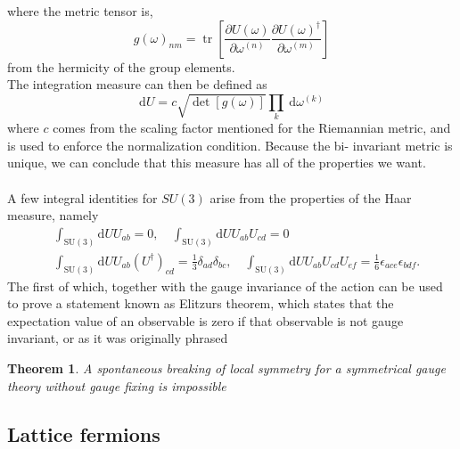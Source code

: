 \documentclass[a4paper,10pt]{article}
\newtheorem{theorem}{Theorem}
\begin{document}
where the metric tensor is,
$$
g(\omega)_{n m}=\operatorname{tr}\left[\frac{\partial U(\omega)}{\partial \omega^{(n)}} \frac{\partial U(\omega)^{\dagger}}{\partial \omega^{(m)}}\right]
$$
from the hermicity of the group elements.\\
The integration measure can then be defined as
\begin{equation}
\mathrm{d} U=c \sqrt{\operatorname{det}[g(\omega)]} \prod_{k} \mathrm{~d} \omega^{(k)}
\end{equation}
where $c$ comes from the scaling factor mentioned for the Riemannian metric, and is used to enforce the normalization condition.
Because the bi- invariant metric is unique, we can conclude that this measure has all of the properties we want.\\\\A few integral identities for $SU(3)$ arise from the properties of the Haar measure, namely
\begin{equation}
\begin{aligned}
&\int_{\mathrm{SU}(3)} \mathrm{d} U U_{a b}=0, \quad
\int_{\mathrm{SU}(3)} \mathrm{d} U U_{a b} U_{c d}=0 \\
&\int_{\mathrm{SU}(3)} \mathrm{d} U U_{a b}\left(U^{\dagger}\right)_{c d}=\frac{1}{3} \delta_{a d} \delta_{b c},\quad
\int_{\mathrm{SU}(3)} \mathrm{d} U U_{a b} U_{c d} U_{e f}=\frac{1}{6} \epsilon_{a c e} \epsilon_{b d f}.
\end{aligned}
\end{equation}
The first of which, together with the gauge invariance of the action can be used to prove a statement known as Elitzurs theorem, which states that the expectation value of an observable is zero if that observable is not gauge invariant, or as it was originally phrased\cite{1975PhRvD}
\begin{theorem}
A spontaneous breaking of local symmetry for a symmetrical gauge theory without gauge fixing is impossible
\end{theorem}
\subsection{Lattice fermions}
\end{document}
